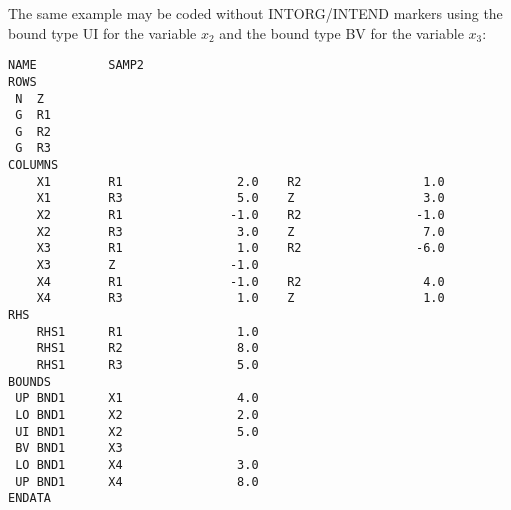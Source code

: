 The same example may be coded without INTORG/INTEND markers using the
bound type UI for the variable $x_2$ and the bound type BV for the
variable $x_3$:

\begin{verbatim}
NAME          SAMP2
ROWS
 N  Z
 G  R1
 G  R2
 G  R3
COLUMNS
    X1        R1                2.0    R2                 1.0
    X1        R3                5.0    Z                  3.0
    X2        R1               -1.0    R2                -1.0
    X2        R3                3.0    Z                  7.0
    X3        R1                1.0    R2                -6.0
    X3        Z                -1.0
    X4        R1               -1.0    R2                 4.0
    X4        R3                1.0    Z                  1.0
RHS
    RHS1      R1                1.0
    RHS1      R2                8.0
    RHS1      R3                5.0
BOUNDS
 UP BND1      X1                4.0
 LO BND1      X2                2.0
 UI BND1      X2                5.0
 BV BND1      X3
 LO BND1      X4                3.0
 UP BND1      X4                8.0
ENDATA
\end{verbatim}

